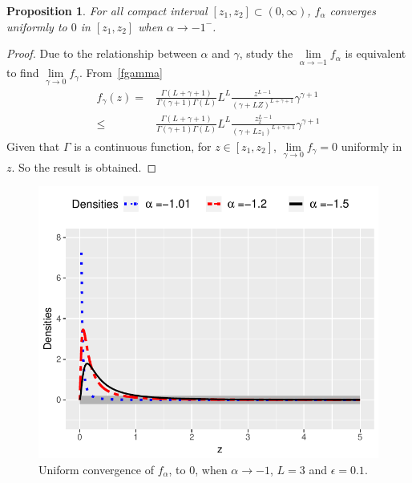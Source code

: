 \documentclass[journal]{IEEEtran}
\newtheorem{proposition}{Proposition}
\numberwithin{equation}{section}
\newenvironment{dem}[1][Proof]{\begin{proof}[{\it #1}]}{\end{proof}}
\newcommand{\pa}[1]{\ensuremath{\left( #1 \right)}}
\begin{document}
\begin{proposition}
	For all compact interval $[z_{1},z_{2}]\subset\pa{0,\infty}$, $f_{\alpha}$ converges uniformly to $0$ in $[z_{1},z_{2}]$ when $\alpha\to -1^{-}$.
	\label{pr: convergenciauniforme2}
\end{proposition}
\begin{dem} 
	Due to the relationship between $\alpha$ and $\gamma$, study the $\lim\limits_{\alpha\to-1} f_{\alpha}$ is equivalent to find
	$\lim\limits_{\gamma\to0} f_{\gamma}.$
	From~\ref{fgamma}
	\begin{align*}
	 f_{\gamma}\pa{z} = &\frac{\Gamma\pa{L+\gamma+1}}{\Gamma\pa{\gamma+1}\Gamma\pa{L}}
	L^{L} \frac{z^{L-1}}{(\gamma+LZ)^{L+\gamma+1}} \gamma^{\gamma +1}  \\
	\leq& \frac{\Gamma\pa{L+\gamma+1}}{\Gamma\pa{\gamma+1}\Gamma\pa{L}}
	L^{L} \frac{z_2^{L-1}}{(\gamma+Lz_1)^{L+\gamma+1}} \gamma^{\gamma +1} 
	\end{align*}
	Given that $\Gamma$ is a continuous function, for $z \in [z_{1},z_{2}]$, $\lim\limits_{\gamma\to0} f_{\gamma}=0$ uniformly in $z$. So the result is obtained.
\end{dem}
\vspace{0.2cm}
\begin{figure}[hbt]
	\centering    
	\includegraphics[scale=0.5]{../../../Figures/DTTeorico/ConvUnifEnCero.pdf}
	\caption{\label{ConvEnCero}Uniform convergence of $f_{\alpha}$, to $0$, when $\alpha \to -1$, $L=3$ and $\epsilon=0.1$.}
\end{figure}
\end{document}
